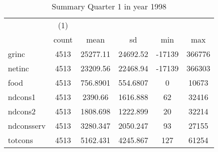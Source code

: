 \begin{table}[htbp]\centering
\def\sym#1{\ifmmode^{#1}\else\(^{#1}\)\fi}
\caption{Summary Quarter 1 in year 1998 \label{sum\_Q1\_y1998}}
\begin{tabular}{l*{1}{ccccc}}
\hline\hline
            &\multicolumn{1}{c}{(1)}&            &            &            &            \\
            &       count&        mean&          sd&         min&         max\\
\hline
grinc       &        4513&    25277.11&    24692.52&      -17139&      366776\\
netinc      &        4513&    23209.56&    22468.94&      -17139&      366303\\
food        &        4513&    756.8901&    554.6807&           0&       10673\\
ndcons1     &        4513&     2390.66&    1616.888&          62&       32416\\
ndcons2     &        4513&    1808.698&    1222.899&          20&       32214\\
ndconsserv  &        4513&    3280.347&    2050.247&          93&       27155\\
totcons     &        4513&    5162.431&    4245.867&         127&       61254\\
\hline\hline
\end{tabular}
\end{table}
